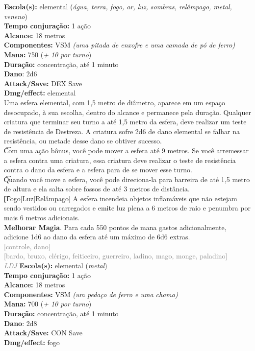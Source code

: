 \documentclass{RPG_Adventure}[2021/10/20]
\begin{document}
{\small \t \textbf{Escola(s):} elemental (\textit{água, terra, fogo, ar, luz, sombras, relâmpago, metal, veneno})\\\t \textbf{Tempo conjuração:} 1 ação\\\t \textbf{Alcance:} 18 metros\\\t \textbf{Componentes:} VSM \textit{(uma pitada de enxofre e uma camada de pó de ferro)}\\\t \textbf{Mana:} 750 (\textit{+ 10 por turno})\\\t \textbf{Duração:} concentração, até 1 minuto\\\t \textbf{Dano}: 2d6\\\t \textbf{Attack/Save:} DEX Save\\\t \textbf{Dmg/effect:} elemental\\}
{\normalsize Uma esfera elemental, com 1,5 metro de diâmetro, aparece em um espaço desocupado, à sua escolha, dentro do alcance e permanece pela duração. Qualquer criatura que terminar seu turno a até 1,5 metro da esfera, deve realizar um teste de resistência de Destreza. A criatura sofre 2d6 de dano elemental se falhar na resistência, ou metade desse dano se obtiver sucesso.\\\t Com uma ação bônus, você pode mover a esfera até 9 metros. Se você arremessar a esfera contra uma criatura, essa criatura deve realizar o teste de resistência contra o dano da esfera e a esfera para de se mover esse turno.\\\t Quando você move a esfera, você pode direciona-la para barreira de até 1,5 metro de altura e ela salta sobre fossos de até 3 metros de distância.\\\t [Fogo|Luz|Relâmpago] A esfera incendeia objetos inflamáveis que não estejam sendo vestidos ou carregados e emite luz plena a 6 metros de raio e penumbra por mais 6 metros adicionais.\\\t \textbf{Melhorar Magia}. Para cada 550 pontos de mana gastos adicionalmente, adicione 1d6 ao dano da esfera até um máximo de 6d6 extras.\\}
{\scriptsize \textcolor{gray}{[controle, dano]\\}}
{\scriptsize \textcolor{gray}{[bardo, bruxo, clérigo, feiticeiro, guerreiro, ladino, mago, monge, paladino]\\}}
{\tiny \textcolor{gray}{\textit{LDJ}}}\jump{}
{\small \t \textbf{Escola(s):} elemental (\textit{metal})\\\t \textbf{Tempo conjuração:} 1 ação\\\t \textbf{Alcance:} 18 metros\\\t \textbf{Componentes:} VSM \textit{(um pedaço de ferro e uma chama)}\\\t \textbf{Mana:} 700 (\textit{+ 10 por turno})\\\t \textbf{Duração:} concentração, até 1 minuto\\\t \textbf{Dano}: 2d8\\\t \textbf{Attack/Save:} CON Save\\\t \textbf{Dmg/effect:} fogo\\}
\end{document}
